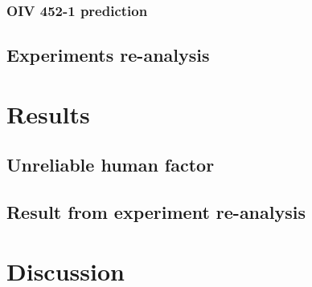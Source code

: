 \documentclass[english]{article}
\begin{document}
\subsubsection*{OIV 452-1 prediction}

\subsection*{Experiments re-analysis}

\section*{Results}

\subsection{Unreliable human factor}

\subsection{Result from experiment re-analysis}

\section*{Discussion}

\printbibliography
\end{document}
